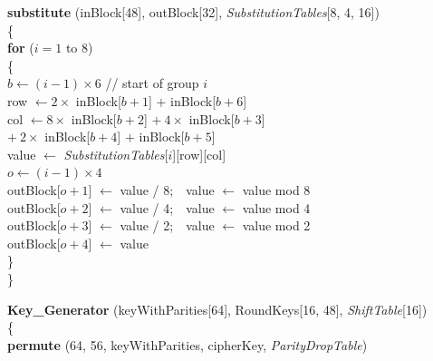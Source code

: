 \begin{worked}
\begin{minipage}[t]{0.49\linewidth}\small
\textbf{substitute} (inBlock[48], outBlock[32], \emph{SubstitutionTables}[8, 4, 16])\\
\{\\
\hspace*{1em}\textbf{for} ($i = 1$ to 8)\\
\hspace*{1em}\{\\
\hspace*{2em}$b \leftarrow (i - 1) \times 6$ \hfill // start of group $i$\\
\hspace*{2em}row $\leftarrow 2 \times$ inBlock[$b{+}1$] $+$ inBlock[$b{+}6$]\\
\hspace*{2em}col $\leftarrow 8 \times$ inBlock[$b{+}2$] $+ \ 4 \times$ inBlock[$b{+}3$]\\
\hspace*{4.5em}$+\ 2 \times$ inBlock[$b{+}4$] $+$ inBlock[$b{+}5$]\\
\hspace*{2em}value $\leftarrow$ \emph{SubstitutionTables}[$i$][row][col]\\
\hspace*{2em}$o \leftarrow (i - 1) \times 4$\\
\hspace*{2em}outBlock[$o{+}1$] $\leftarrow$ value / 8;\ \ value $\leftarrow$ value mod 8\\
\hspace*{2em}outBlock[$o{+}2$] $\leftarrow$ value / 4;\ \ value $\leftarrow$ value mod 4\\
\hspace*{2em}outBlock[$o{+}3$] $\leftarrow$ value / 2;\ \ value $\leftarrow$ value mod 2\\
\hspace*{2em}outBlock[$o{+}4$] $\leftarrow$ value\\
\hspace*{1em}\}\\
\}
\end{minipage}\hfill
\begin{minipage}[t]{0.47\linewidth}\small
\textbf{Key\_Generator} (keyWithParities[64], RoundKeys[16, 48], \emph{ShiftTable}[16])\\
\{\\
\hspace*{1em}\textbf{permute} (64, 56, keyWithParities, cipherKey, \emph{ParityDropTable})\\

\end{minipage}
\end{worked}
